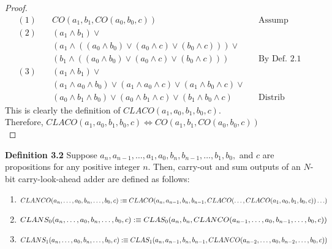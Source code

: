 \documentclass{article}
\begin{document}
\begin{proof}
	\begin{align*}
		(1) & \quad CO(a_1, b_1, CO(a_0, b_0, c)) && \text{Assump} \\
		(2) & \quad (a_1 \land b_1)  \lor \\ 
		& \quad (a_1 \land ((a_0 \land b_0) \lor (a_0 \land c) \lor (b_0 \land c)) ) \lor \\ 
		& \quad (b_1 \land ((a_0 \land b_0) \lor (a_0 \land c) \lor (b_0 \land c))) 
		&& \text{By Def. 2.1} \\
		(3) & \quad (a_1 \land b_1)  \lor \\ 
		& \quad (a_1 \land a_0 \land b_0) \lor (a_1 \land a_0 \land c) \lor (a_1 \land b_0 \land c) \lor \\
		& \quad (a_0 \land b_1 \land b_0) \lor (a_0 \land b_1 \land c) \lor (b_1 \land b_0 \land c) && \text{Distrib}
	\end{align*}
	This is clearly the definition of $ CLACO(a_1, a_0, b_1, b_0, c) .$\\
	 Therefore, $CLACO(a_1, a_0, b_1, b_0, c) \iff CO(a_1, b_1, CO(a_0, b_0, c))  $  \\
\end{proof}

\noindent \textbf{Definition 3.2} Suppose $a_n, a_{n-1}, \ldots, a_1, a_0, b_n, b_{n-1}, \ldots, b_1, b_0,$ and $c$ are propositions for any positive integer $ n $. Then, carry-out and sum outputs of an $N$-bit carry-look-ahead adder are defined as follows: 
\begin{enumerate}
	\item $ CLANCO(a_n, \ldots, a_0, b_n, \ldots, b_0, c) :\equiv  \\
	CLACO(a_n, a_{n-1}, b_n, b_{n-1}, CLACO(\ldots, CLACO(a_1, a_0, b_1, b_0, c))\ldots)$
	\item $ CLANS_0(a_n, \ldots, a_0, b_n, \ldots, b_0, c) :\equiv \\ 
	CLAS_0(a_n, b_n, CLANCO(a_{n-1}, \ldots, a_0, b_{n-1}, \ldots, b_0, c)) $
	\item $ CLANS_1(a_n, \ldots, a_0, b_n, \ldots, b_0, c) :\equiv \\ 
	CLAS_1(a_n, a_{n-1}, b_n, b_{n-1}, CLANCO(a_{n-2}, \ldots, a_0, b_{n-2}, \ldots, b_0, c)) $
\end{enumerate}
\end{document}
